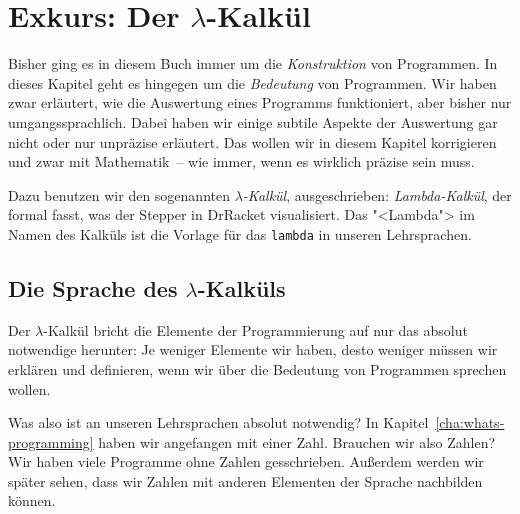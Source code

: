 
\chapter{Exkurs: Der $\lambda$-Kalkül}
\label{chap:lambda}

\newcommand{\lrm}{\mathrm}


Bisher ging es in diesem Buch immer um die \emph{Konstruktion} von
Programmen.  In dieses Kapitel geht es hingegen um die
\textit{Bedeutung} von Programmen.  Wir haben zwar erläutert, wie die
Auswertung eines Programms funktioniert, aber bisher nur
umgangssprachlich.  Dabei haben wir einige subtile Aspekte der
Auswertung gar nicht oder nur unpräzise erläutert.  Das wollen wir in
diesem Kapitel korrigieren und zwar mit Mathematik~-- wie immer, wenn
es wirklich präzise sein muss.

Dazu benutzen wir den sogenannten \textit{$\lambda$-Kalkül},
ausgeschrieben: \textit{Lambda-Kalkül}, der formal fasst, was der
Stepper in DrRacket visualisiert.  Das "<Lambda"> im Namen des Kalküls
ist die Vorlage für das \lstinline{lambda} in unseren Lehrsprachen.

\section{Die Sprache des $\lambda$-Kalküls}
\label{sec:sprache}

Der $\lambda$-Kalkül bricht die Elemente der Programmierung auf nur
das absolut notwendige herunter: Je weniger Elemente wir haben, desto
weniger müssen wir erklären und definieren, wenn wir über die
Bedeutung von Programmen sprechen wollen.

Was also ist an unseren Lehrsprachen absolut notwendig?  In
Kapitel~\ref{cha:whats-programming} haben wir angefangen mit einer
Zahl.  Brauchen wir also Zahlen?  Wir haben viele Programme ohne
Zahlen gesschrieben.  Außerdem werden wir später sehen, dass wir
Zahlen mit anderen Elementen der Sprache nachbilden können.

